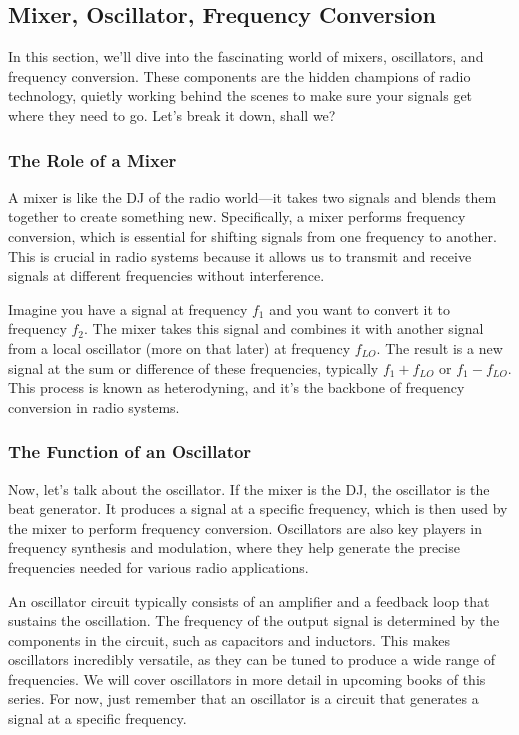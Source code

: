 \subsection{Mixer, Oscillator, Frequency Conversion}
\label{subsec:mixer-osc}

In this section, we'll dive into the fascinating world of mixers, oscillators, and frequency conversion. These components are the hidden champions of radio technology, quietly working behind the scenes to make sure your signals get where they need to go. Let's break it down, shall we?

\subsubsection*{The Role of a Mixer}

A mixer is like the DJ of the radio world—it takes two signals and blends them together to create something new. Specifically, a mixer performs frequency conversion, which is essential for shifting signals from one frequency to another. This is crucial in radio systems because it allows us to transmit and receive signals at different frequencies without interference.

Imagine you have a signal at frequency \( f_1 \) and you want to convert it to frequency \( f_2 \). The mixer takes this signal and combines it with another signal from a local oscillator (more on that later) at frequency \( f_{LO} \). The result is a new signal at the sum or difference of these frequencies, typically \( f_1 + f_{LO} \) or \( f_1 - f_{LO} \). This process is known as heterodyning, and it's the backbone of frequency conversion in radio systems.





\subsubsection*{The Function of an Oscillator}

Now, let's talk about the oscillator. If the mixer is the DJ, the oscillator is the beat generator. It produces a signal at a specific frequency, which is then used by the mixer to perform frequency conversion. Oscillators are also key players in frequency synthesis and modulation, where they help generate the precise frequencies needed for various radio applications.

An oscillator circuit typically consists of an amplifier and a feedback loop that sustains the oscillation. The frequency of the output signal is determined by the components in the circuit, such as capacitors and inductors. This makes oscillators incredibly versatile, as they can be tuned to produce a wide range of frequencies. We will cover oscillators in more detail in upcoming books of this series. For now, just remember that an oscillator is a circuit that generates a signal at a specific frequency.


